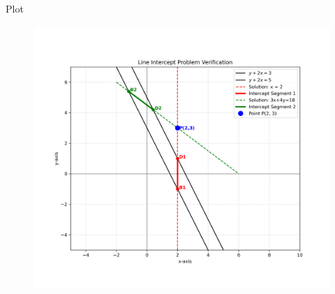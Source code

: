 \documentclass{beamer}
\begin{document}
\begin{frame}{Plot}
\begin{figure}
	\centering
	\includegraphics[width=1\linewidth]{figs/line_intercept_plot}
	\caption{}
	\label{fig:lineinterceptplot}
\end{figure}

\end{frame}
\end{document}
